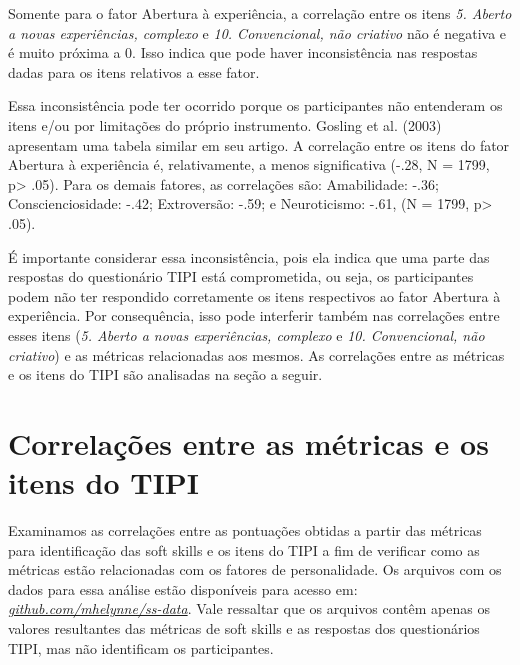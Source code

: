 Somente para o fator Abertura à experiência, a correlação entre os itens \textit{5. Aberto a novas experiências, complexo} e \textit{10. Convencional, não criativo} não é negativa e é muito próxima a 0. Isso indica que pode haver inconsistência nas respostas dadas para os itens relativos a esse fator.

Essa inconsistência pode ter ocorrido porque os participantes não entenderam os itens e/ou por limitações do próprio instrumento. Gosling et al. (2003)\nocite{gosling:03} apresentam uma tabela similar em seu artigo. A correlação entre os itens do fator Abertura à experiência é, relativamente, a menos significativa (-.28, N = 1799, p> .05).
Para os demais fatores, as correlações são: Amabilidade: -.36; Conscienciosidade: -.42; Extroversão: -.59; e Neuroticismo: -.61, (N = 1799, p> .05).

É importante considerar essa inconsistência, pois ela indica que uma parte das respostas do questionário TIPI está comprometida, ou seja, os participantes podem não ter respondido corretamente os itens respectivos ao fator Abertura à experiência. Por consequência, isso pode interferir também nas correlações entre esses itens (\textit{5. Aberto a novas experiências, complexo} e \textit{10. Convencional, não criativo}) e as métricas relacionadas aos mesmos.
As correlações entre as métricas e os itens do TIPI são analisadas na seção a seguir.

\section{Correlações entre as métricas e os itens do TIPI}
\label{sec:tipiss}

Examinamos as correlações entre as pontuações obtidas a partir das métricas para identificação das soft skills e os itens do TIPI a fim de verificar como as métricas estão relacionadas com os fatores de personalidade.
Os arquivos com os dados para essa análise estão disponíveis para acesso em:
\href{https://github.com/mhelynne/ss-data}{\textit{github.com/mhelynne/ss-data}}.
Vale ressaltar que os arquivos contêm apenas os valores resultantes das métricas de soft skills e as respostas dos questionários TIPI, mas não identificam os participantes.

